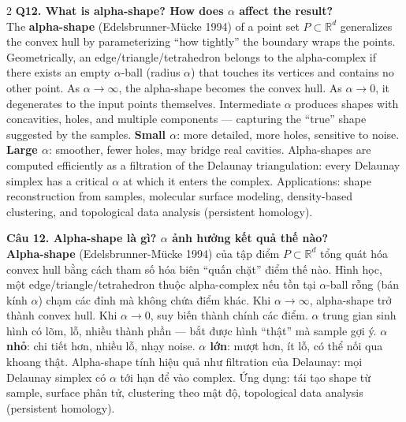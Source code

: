 \begin{paracol}{2}
\textbf{Q12. What is alpha-shape? How does $\alpha$ affect the result?}\\
The \textbf{alpha-shape} (Edelsbrunner-Mücke 1994) of a point set $P \subset \mathbb{R}^d$ generalizes the convex hull by parameterizing ``how tightly'' the boundary wraps the points. Geometrically, an edge/triangle/tetrahedron belongs to the alpha-complex if there exists an empty $\alpha$-ball (radius $\alpha$) that touches its vertices and contains no other point. As $\alpha \to \infty$, the alpha-shape becomes the convex hull. As $\alpha \to 0$, it degenerates to the input points themselves. Intermediate $\alpha$ produces shapes with concavities, holes, and multiple components — capturing the ``true'' shape suggested by the samples. \textbf{Small $\alpha$}: more detailed, more holes, sensitive to noise. \textbf{Large $\alpha$}: smoother, fewer holes, may bridge real cavities. Alpha-shapes are computed efficiently as a filtration of the Delaunay triangulation: every Delaunay simplex has a critical $\alpha$ at which it enters the complex. Applications: shape reconstruction from samples, molecular surface modeling, density-based clustering, and topological data analysis (persistent homology).

\switchcolumn

\textbf{Câu 12. Alpha-shape là gì? $\alpha$ ảnh hưởng kết quả thế nào?}\\
\textbf{Alpha-shape} (Edelsbrunner-Mücke 1994) của tập điểm $P \subset \mathbb{R}^d$ tổng quát hóa convex hull bằng cách tham số hóa biên ``quấn chặt'' điểm thế nào. Hình học, một edge/triangle/tetrahedron thuộc alpha-complex nếu tồn tại $\alpha$-ball rỗng (bán kính $\alpha$) chạm các đỉnh mà không chứa điểm khác. Khi $\alpha \to \infty$, alpha-shape trở thành convex hull. Khi $\alpha \to 0$, suy biến thành chính các điểm. $\alpha$ trung gian sinh hình có lõm, lỗ, nhiều thành phần — bắt được hình ``thật'' mà sample gợi ý. \textbf{$\alpha$ nhỏ}: chi tiết hơn, nhiều lỗ, nhạy noise. \textbf{$\alpha$ lớn}: mượt hơn, ít lỗ, có thể nối qua khoang thật. Alpha-shape tính hiệu quả như filtration của Delaunay: mọi Delaunay simplex có $\alpha$ tới hạn để vào complex. Ứng dụng: tái tạo shape từ sample, surface phân tử, clustering theo mật độ, topological data analysis (persistent homology).

\switchcolumn*


\end{paracol}
